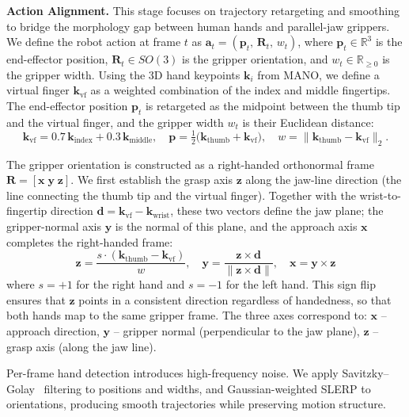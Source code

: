 \textbf{Action Alignment.} 
This stage focuses on trajectory retargeting and smoothing to bridge the morphology gap between human hands and parallel-jaw grippers.
We define the robot action at frame $t$ as $\mathbf{a}_t = (\mathbf{p}_t,\,\mathbf{R}_t,\,w_t)$, where $\mathbf{p}_t\in\mathbb{R}^3$ is the end-effector position, $\mathbf{R}_t\in SO(3)$ is the gripper orientation, and $w_t\in\mathbb{R}_{\geq 0}$ is the gripper width.
Using the 3D hand keypoints $\mathbf{k}_i$ from MANO, we define a virtual finger $\mathbf{k}_\text{vf}$ as a weighted combination of the index and middle fingertips. 
The end-effector position $\mathbf{p}_t$ is retargeted as the midpoint between the thumb tip and the virtual finger, and the gripper width $w_t$ is their Euclidean distance:
\begin{equation}
  \mathbf{k}_\text{vf} = 0.7\,\mathbf{k}_\text{index} + 0.3\,\mathbf{k}_\text{middle},\quad
  \mathbf{p} = \tfrac{1}{2}\bigl(\mathbf{k}_\text{thumb} + \mathbf{k}_\text{vf}\bigr),\quad
  w = \|\mathbf{k}_\text{thumb} - \mathbf{k}_\text{vf}\|_2.
  \label{eq:eef}
\end{equation}

The gripper orientation is constructed as a right-handed orthonormal frame $\mathbf{R}=[\mathbf{x}\;\mathbf{y}\;\mathbf{z}]$. We first establish the grasp axis $\mathbf{z}$ along the jaw-line direction (the line connecting the thumb tip and the virtual finger). 
Together with the wrist-to-fingertip direction $\mathbf{d}=\mathbf{k}_\text{vf}-\mathbf{k}_\text{wrist}$, these two vectors define the jaw plane; the gripper-normal axis $\mathbf{y}$ is the normal of this plane, and the approach axis $\mathbf{x}$ completes the right-handed frame:
\begin{equation}
    \mathbf{z} = \frac{s \cdot (\mathbf{k}_\text{thumb} - \mathbf{k}_\text{vf})}{w}, \quad
    \mathbf{y} = \frac{\mathbf{z} \times \mathbf{d}}{\|\mathbf{z} \times \mathbf{d}\|}, \quad
    \mathbf{x} = \mathbf{y} \times \mathbf{z}
\end{equation}
where $s=+1$ for the right hand and $s=-1$ for the left hand. This sign flip ensures that $\mathbf{z}$ points in a consistent direction regardless of handedness, so that both hands map to the same gripper frame. The three axes correspond to: $\mathbf{x}$ -- approach direction, $\mathbf{y}$ -- gripper normal (perpendicular to the jaw plane), $\mathbf{z}$ -- grasp axis (along the jaw line).

Per-frame hand detection introduces high-frequency noise. 
We apply Savitzky--Golay~\citep{savitzky1964smoothing} filtering to positions and widths, and Gaussian-weighted SLERP to orientations, producing smooth trajectories while preserving motion structure.

